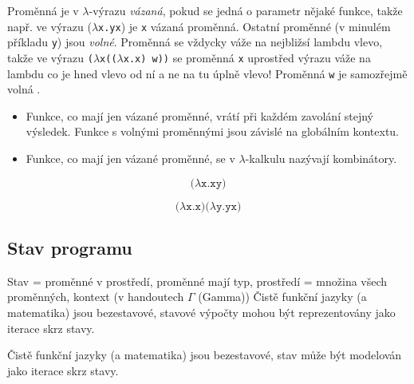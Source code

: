 \noindent Proměnná je v $\lambda$-výrazu \textit{vázaná}, pokud se jedná o parametr nějaké funkce, takže např. ve výrazu (\texttt{$\lambda$x.yx}) je \texttt{x} vázaná proměnná. Ostatní proměnné (v minulém příkladu \texttt{y}) jsou \textit{volné}. Proměnná se vždycky váže na nejbližsí lambdu vlevo, takže ve výrazu \texttt{($\lambda$x(($\lambda$x.x) w))} se proměnná \texttt{x} uprostřed výrazu váže na lambdu co je hned vlevo od ní a ne na tu úplně vlevo! Proměnná \texttt{w} je samozřejmě volná \cite{lambda}.

\begin{itemize}
\item Funkce, co mají jen vázané proměnné, vrátí při každém zavolání stejný výsledek. Funkce s volnými proměnnými jsou závislé na globálním kontextu.
\item Funkce, co mají jen vázané proměnné, se v $\lambda$-kalkulu nazývají kombinátory.
\end{itemize}

$$\texttt{(}\lambda\texttt{x.xy)}$$

$$\texttt{(}\lambda\texttt{x.x)(}\lambda\texttt{y.yx)}$$

\subsection{Stav programu}
Stav = proměnné v prostředí, proměnné mají typ, prostředí = množina všech proměnných, kontext (v handoutech $\Gamma$ (Gamma))
Čistě funkční jazyky (a matematika) jsou bezestavové, stavové výpočty mohou být reprezentovány jako iterace skrz stavy.

Čistě funkční jazyky (a matematika) jsou bezestavové, stav může být modelován jako iterace skrz stavy.

